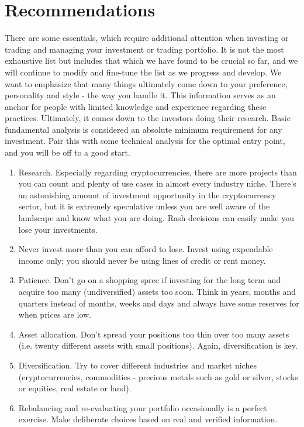 \newpage

\section{Recommendations}
There are some essentials, which require additional attention when investing or trading and managing your investment or trading portfolio. It is not the most exhaustive list but includes that which we have found to be crucial so far, and we will continue to modify and fine-tune the list as we progress and develop. We want to emphasize that many things ultimately come down to your preference, personality and style - the way you handle it. This information serves as an anchor for people with limited knowledge and experience regarding these practices. Ultimately, it comes down to the investors doing their research. Basic fundamental analysis is considered an absolute minimum requirement for any investment. Pair this with some technical analysis for the optimal entry point, and you will be off to a good start.

\begin{enumerate}[label=\Roman*]
    \setlength\itemsep{0em}
     \item Research. Especially regarding cryptocurrencies, there are more projects than you can count and plenty of use cases in almost every industry niche. There's an astonishing amount of investment opportunity in the cryptocurrency sector, but it is extremely speculative unless you are well aware of the landscape and know what you are doing. Rash decisions can easily make you lose your investments.
    \item Never invest more than you can afford to lose. Invest using expendable income only; you should never be using lines of credit or rent money.
    \item Patience. Don't go on a shopping spree if investing for the long term and acquire too many (undiversified) assets too soon. Think in years, months and quarters instead of months, weeks and days and always have some reserves for when prices are low.
    \item Asset allocation. Don't spread your positions too thin over too many assets (i.e. twenty different assets with small positions). Again, diversification is key.
    \item Diversification. Try to cover different industries and market niches (cryptocurrencies, commodities - precious metals such as gold or silver, stocks or equities, real estate or land).
    \item Rebalancing and re-evaluating your portfolio occasionally is a perfect exercise. Make deliberate choices based on real and verified information.
\end{enumerate}
